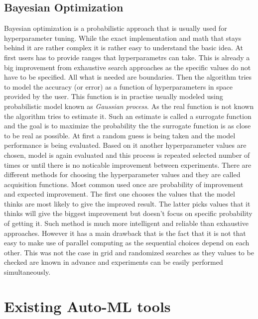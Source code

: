 \documentclass[a4paper,twoside,12pt]{book}
\begin{document}
\subsection{Bayesian Optimization}

Bayesian optimization\cite{snoek2012practical} is a probabilistic approach that is usually used for hyperparameter tuning. While the exact implementation and math that stays behind it are rather complex it is rather easy to understand the basic idea.
At first users has to provide ranges that hyperparametrs can take. This is already a big improvement from exhaustive search approaches as the specific values do not have to be specified. All what is needed are boundaries.
Then the algorithm tries to model the accuracy (or error) as a function of hyperparameters in space provided by the user. This function is in practise usually modeled using probabilistic model known as \emph{Gaussian process}\cite{mackay1998introduction}.
As the real function is not known the algorithm tries to estimate it. Such an estimate is called a surrogate function and the goal is to maximize the probability the the surrogate function is as close to be real as possible.
At first a random guess is being taken and the model performance is being evaluated. Based on it another hyperparameter values are chosen, model is again evaluated and this process is repeated selected number of times or until there is no noticable improvement between experiments.
There are different methods for choosing the hyperparameter values and they are called acquisition functions.
Most common used once are probability of improvement and expected improvement. 
The first one chooses the values that the model thinks are most likely to give the improved result. The latter picks values that it thinks will give the biggest improvement but doesn't focus on specific probability of getting it.
Such method is much more intelligent and reliable than exhaustive approaches. However it has a main drawback that is the fact that it is not that easy to make use of parallel computing as the sequential choices depend on each other. 
This was not the case in grid and randomized searches as they values to be checked are known in advance and experiments can be easily performed simultaneously.

\section{Existing Auto-ML tools}
\end{document}
